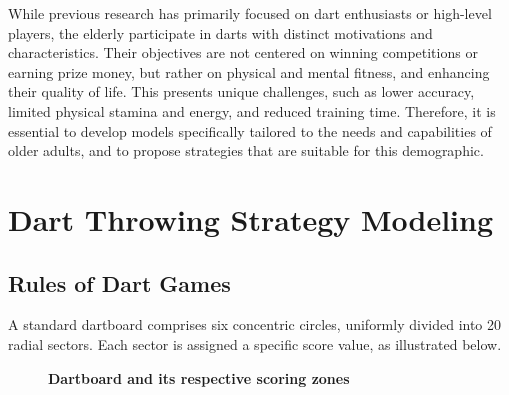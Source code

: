 \documentclass[cjjs]{ipart}
\theoremstyle{plain}
\begin{document}
While previous research has primarily focused on dart enthusiasts or high-level players, the elderly participate in darts with distinct motivations and characteristics. Their objectives are not centered on winning competitions or earning prize money, but rather on physical and mental fitness, and enhancing their quality of life. This presents unique challenges, such as lower accuracy, limited physical stamina and energy, and reduced training time. Therefore, it is essential to develop models specifically tailored to the needs and capabilities of older adults, and to propose strategies that are suitable for this demographic.


\section{Dart Throwing Strategy Modeling}

\subsection{Rules of Dart Games}
A standard dartboard comprises six concentric circles, uniformly divided into 20 radial sectors. Each sector is assigned a specific score value, as illustrated below.

\begin{figure}[h]
\centering
\begin{minipage}{0.45\textwidth}
    \centering
    \caption{\textbf{Dartboard and its respective scoring zones}}
\end{minipage}
\end{figure}
\end{document}
